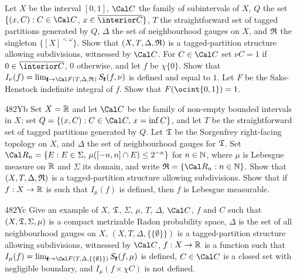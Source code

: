{
Let $X$ be the interval $[0,1]$,
$\Cal C$ the family of subintervals of $X$,
$Q$ the set $\{(x,C):C\in\Cal C$, $x\in\overline{\interior C}\}$, $T$ the
straightforward set of tagged partitions generated by $Q$, $\Delta$ the set
of neighbourhood gauges on $X$, and $\frak R$ the singleton
$\{[X]^{<\omega}\}$.   Show that $(X,T,\Delta,\frak R)$ is a
tagged-partition structure allowing subdivisions, witnessed by $\Cal C$.
For $C\in\Cal C$ set $\nu C=1$ if $0\in\overline{\interior C}$, $0$
otherwise, and let $f$ be $\chi\{0\}$.   Show that
$I_{\nu}(f)=\lim_{\pmb{t}\to\Cal F(T,\Delta,\frak R)}S_{\pmb{t}}(f,\nu)$
is defined and equal
to $1$.   Let $F$ be the Saks-Henstock indefinite integral of $f$.
Show that $F(\ocint{0,1})=1$.

\spheader 482Yb
Set $X=\Bbb R$ and let $\Cal C$ be the family of
non-empty bounded intervals in $X$;  set
$Q=\{(x,C):C\in\Cal C,\,x=\inf C\}$, and let $T$ be the
straightforward
set of tagged partitions generated by $Q$.   Let $\frak T$ be the
Sorgenfrey right-facing topology on $X$, and $\Delta$ the set of
neighbourhood gauges for $\frak T$.   Set
$\Cal R_n=\{E:E\in\Sigma,\,\mu([-n,n]\cap E)\le 2^{-n}\}$ for
$n\in\Bbb N$, where $\mu$ is Lebesgue measure on $\Bbb R$ and $\Sigma$
its domain, and write $\frak R=\{\Cal R_n:n\in\Bbb N\}$.   Show that
$(X,T,\Delta,\frak R)$ is a tagged-partition structure allowing
subdivisions.   Show that if $f:X\to\Bbb R$ is such that $I_{\mu}(f)$
is defined, then $f$ is Lebesgue measurable.

\spheader 482Yc Give an example of $X$, $\frak T$, $\Sigma$, $\mu$,
$T$, $\Delta$, $\Cal C$, $f$ and $C$ such that
$(X,\frak T,\Sigma,\mu)$ is a compact metrizable Radon probability
space, $\Delta$ is the set of all neighbourhood gauges on $X$,
$(X,T,\Delta,\{\{\emptyset\}\})$ is a tagged-partition structure
allowing subdivisions, witnessed by
$\Cal C$, $f:X\to\Bbb R$ is a function such that $I_{\mu}(f)
=\lim_{\pmb{t}\to\Cal F(T,\Delta,\{\{\emptyset\}\})}S_{\pmb{t}}(f,\mu)$
is defined, $C\in\Cal C$ is a closed set with negligible boundary, and
$I_{\mu}(f\times\chi C)$ is not defined.

}
